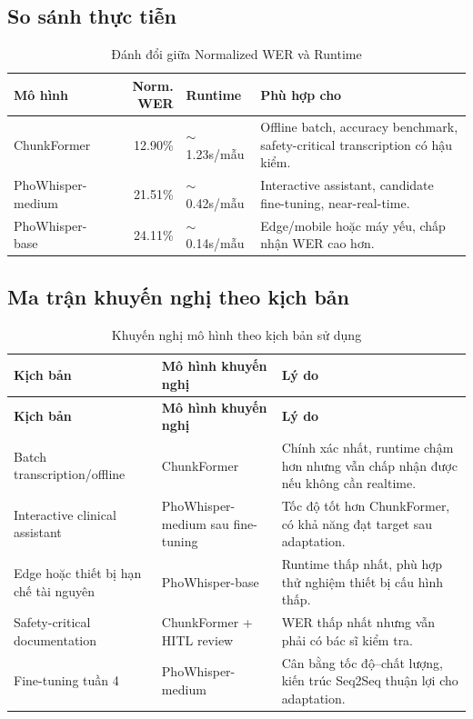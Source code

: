\documentclass[12pt,a4paper]{article}
\begin{document}
\subsection{So sánh thực tiễn}

\begin{table}[h]
\centering
\caption{Đánh đổi giữa Normalized WER và Runtime}
\begin{tabularx}{\textwidth}{|l|r|l|X|}
\hline
\textbf{Mô hình} & \textbf{Norm. WER} & \textbf{Runtime} & \textbf{Phù hợp cho} \\
\hline
ChunkFormer & 12.90\% & $\sim$1.23s/mẫu & Offline batch, accuracy benchmark, safety-critical transcription có hậu kiểm. \\
\hline
PhoWhisper-medium & 21.51\% & $\sim$0.42s/mẫu & Interactive assistant, candidate fine-tuning, near-real-time. \\
\hline
PhoWhisper-base & 24.11\% & $\sim$0.14s/mẫu & Edge/mobile hoặc máy yếu, chấp nhận WER cao hơn. \\
\hline
\end{tabularx}
\end{table}

\subsection{Ma trận khuyến nghị theo kịch bản}

\begin{longtable}{|p{4.2cm}|p{4.2cm}|p{6cm}|}
\caption{Khuyến nghị mô hình theo kịch bản sử dụng}\\
\hline
\textbf{Kịch bản} & \textbf{Mô hình khuyến nghị} & \textbf{Lý do} \\
\hline
\endfirsthead

\hline
\textbf{Kịch bản} & \textbf{Mô hình khuyến nghị} & \textbf{Lý do} \\
\hline
\endhead

Batch transcription/offline & ChunkFormer & Chính xác nhất, runtime chậm hơn nhưng vẫn chấp nhận được nếu không cần realtime. \\
\hline
Interactive clinical assistant & PhoWhisper-medium sau fine-tuning & Tốc độ tốt hơn ChunkFormer, có khả năng đạt target sau adaptation. \\
\hline
Edge hoặc thiết bị hạn chế tài nguyên & PhoWhisper-base & Runtime thấp nhất, phù hợp thử nghiệm thiết bị cấu hình thấp. \\
\hline
Safety-critical documentation & ChunkFormer + HITL review & WER thấp nhất nhưng vẫn phải có bác sĩ kiểm tra. \\
\hline
Fine-tuning tuần 4 & PhoWhisper-medium & Cân bằng tốc độ--chất lượng, kiến trúc Seq2Seq thuận lợi cho adaptation. \\
\hline
\end{longtable}
\end{document}
